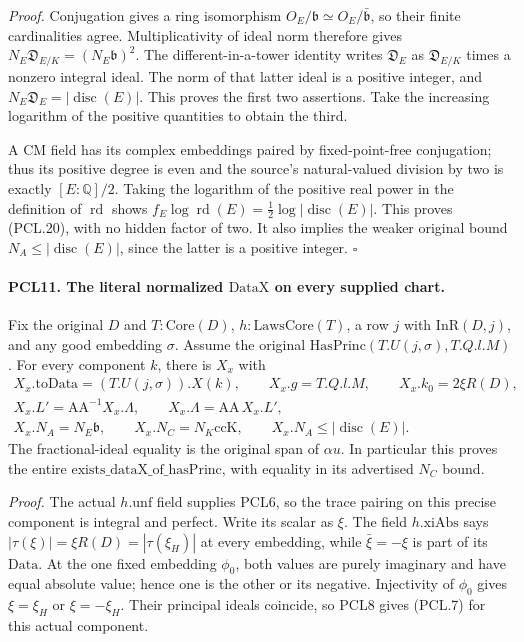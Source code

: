 \documentclass[11pt,a4paper]{article}
\numberwithin{equation}{section}
\theoremstyle{remark}\newtheorem{remark}[theorem]{Remark}
\begin{document}
\emph{Proof.}
Conjugation gives a ring isomorphism
\(O_E/\mathfrak b\simeq O_E/\bar{\mathfrak b}\), so their
finite cardinalities agree.  Multiplicativity of ideal
norm therefore gives
\(N_E\mathfrak D_{E/K}=(N_E\mathfrak b)^2\).
The different-in-a-tower identity writes
\(\mathfrak D_E\) as \(\mathfrak D_{E/K}\) times a
nonzero integral ideal.  The norm of that latter ideal
is a positive integer, and
\(N_E\mathfrak D_E=|\operatorname{disc}(E)|\).  This
proves the first two assertions.  Take the increasing
logarithm of the positive quantities to obtain the third.

A CM field has its complex embeddings paired by
fixed-point-free conjugation; thus its positive degree
is even and the source's natural-valued division by two
is exactly \([E:\mathbb Q]/2\).  Taking the logarithm
of the positive real power in the definition of
\(\operatorname{rd}\) shows
\(f_E\log\operatorname{rd}(E)=\tfrac12\log|\operatorname{disc}(E)|\).
This proves (PCL.20), with no hidden factor of two.
It also implies the weaker original bound
\(N_A\le|\operatorname{disc}(E)|\), since the latter
is a positive integer.
\hfill\(\square\)

\paragraph{PCL11. The literal normalized \(\mathrm{DataX}\) on every supplied chart.}
\label{claim:PCL11}
Fix the original \(D\) and \(T:\mathrm{Core}(D)\),
\(h:\mathrm{LawsCore}(T)\), a row \(j\) with
\(\mathrm{InR}(D,j)\), and any good embedding \(\sigma\).
Assume the original
\(\mathrm{HasPrinc}(T.U(j,\sigma),T.Q.l.M)\).
For every component \(k\), there is \(X_x\) with
\[
 \begin{gathered}
 X_x.\mathrm{toData}=(T.U(j,\sigma)).X(k),\qquad
 X_x.g=T.Q.l.M,\qquad X_x.k_0=2\xi R(D),\\
 X_x.L'=\mathrm{AA}^{-1}X_x.\Lambda,\qquad
 X_x.\Lambda=\mathrm{AA}\,X_x.L',\\
 X_x.N_A=N_E\mathfrak b,\qquad
 X_x.N_C=N_K\mathrm{ccK},\qquad
 X_x.N_A\le|\operatorname{disc}(E)|.
 \end{gathered}                                                   \tag{PCL.21}
\]
The fractional-ideal equality is the original span of
\(\alpha u\).  In particular this proves the entire
\(\mathrm{exists\_\allowbreak dataX\_\allowbreak of\_\allowbreak hasPrinc}\), with equality
in its advertised \(N_C\) bound.

\emph{Proof.}
The actual \(h.\mathrm{unf}\) field supplies PCL6, so
the trace pairing on this precise component is integral
and perfect.  Write its scalar as \(\xi\).
The field \(h.\mathrm{xiAbs}\) says
\(|\tau(\xi)|=\xi R(D)=|\tau(\xi_H)|\) at every
embedding, while \(\bar\xi=-\xi\) is part of its
\(\mathrm{Data}\).  At the one fixed embedding \(\phi_0\),
both values are purely imaginary and have equal absolute
value; hence one is the other or its negative.
Injectivity of \(\phi_0\) gives \(\xi=\xi_H\) or
\(\xi=-\xi_H\).  Their principal ideals coincide,
so PCL8 gives (PCL.7) for this actual component.
\end{document}
